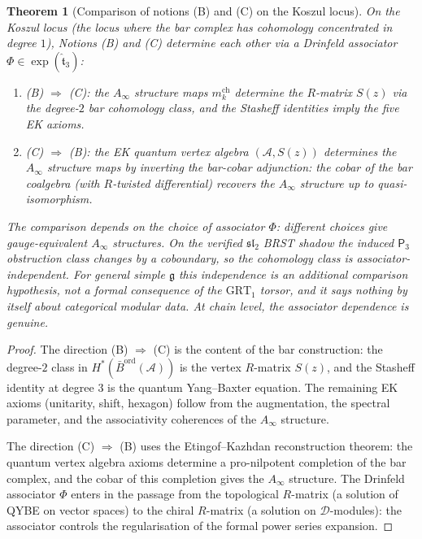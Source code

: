 \documentclass[11pt,reqno]{amsart}
\newtheorem{theorem}{Theorem}[section]
\theoremstyle{definition}
\theoremstyle{remark}
\providecommand{\cA}{\mathcal{A}}
\providecommand{\cD}{\mathcal{D}}
\providecommand{\fg}{\mathfrak{g}}
\providecommand{\Ainf}{A_\infty}
\providecommand{\Pthree}{\mathsf{P}_3}
\providecommand{\Barord}{\bar{B}^{\mathrm{ord}}}
\providecommand{\GRT}{\mathrm{GRT}}
\begin{document}
\begin{theorem}[Comparison of notions (B) and (C) on the
Koszul locus]
\label{thm:e-bc-comparison}
On the Koszul locus \textup{(}the locus where the bar
complex has cohomology concentrated in degree $1$\textup{)},
Notions \textup{(B)} and \textup{(C)} determine each other
via a Drinfeld associator
$\Phi \in \exp(\hat{\mathfrak{t}}_3)$:
\begin{enumerate}[label=\textup{(\roman*)}]
\item \textup{(B)} $\Rightarrow$ \textup{(C):}
 the $\Ainf$ structure maps $m_k^{\mathrm{ch}}$ determine
 the $R$-matrix $S(z)$ via the degree-$2$ bar cohomology
 class, and the Stasheff identities imply the five EK axioms.
\item \textup{(C)} $\Rightarrow$ \textup{(B):}
 the EK quantum vertex algebra $(\cA, S(z))$ determines the
 $\Ainf$ structure maps by inverting the bar-cobar
 adjunction: the cobar of the bar coalgebra (with $R$-twisted
 differential) recovers the $\Ainf$ structure up to
 quasi-isomorphism.
\end{enumerate}
The comparison depends on the choice of associator $\Phi$:
different choices give gauge-equivalent $\Ainf$ structures.
On the verified $\mathfrak{sl}_2$ BRST shadow the induced
$\Pthree$ obstruction class changes by a coboundary, so the
cohomology class is associator-independent. For general simple
$\fg$ this independence is an additional comparison hypothesis, not
a formal consequence of the $\GRT_1$ torsor, and it says nothing by
itself about categorical modular data. At chain level, the
associator dependence is genuine.
\end{theorem}

\begin{proof}
The direction (B) $\Rightarrow$ (C) is the content of the bar
construction: the degree-$2$ class in $H^*(\Barord(\cA))$ is
the vertex $R$-matrix $S(z)$, and the Stasheff identity at
degree $3$ is the quantum Yang--Baxter equation. The remaining
EK axioms (unitarity, shift, hexagon) follow from the
augmentation, the spectral parameter, and the associativity
coherences of the $\Ainf$ structure.

The direction (C) $\Rightarrow$ (B) uses the Etingof--Kazhdan
reconstruction theorem: the quantum vertex algebra axioms
determine a pro-nilpotent completion of the bar complex, and
the cobar of this completion gives the $\Ainf$ structure.
The Drinfeld associator $\Phi$ enters in the passage from the
topological $R$-matrix (a solution of QYBE on vector spaces)
to the chiral $R$-matrix (a solution on $\cD$-modules): the
associator controls the regularisation of the formal power
series expansion.
\end{proof}
\end{document}

